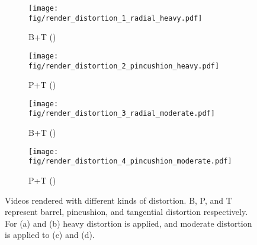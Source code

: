     \begin{figure}[t]
    	\begin{center}
    		\captionsetup{justification=centering}
    		\begin{subfigure}[t]{0.24\linewidth}
    			\centering
    			\texttt{[image: fig/render\_distortion\_1\_radial\_heavy.pdf]}
    			\caption{B+T ()}
    		\end{subfigure}
    		\begin{subfigure}[t]{0.24\linewidth}
    			\centering
    			\texttt{[image: fig/render\_distortion\_2\_pincushion\_heavy.pdf]}
    			\caption{P+T ()}
    		\end{subfigure}
    		\begin{subfigure}[t]{0.24\linewidth}
    			\centering
    			\texttt{[image: fig/render\_distortion\_3\_radial\_moderate.pdf]}
    			\caption{B+T ()}
    		\end{subfigure}
    		\begin{subfigure}[t]{0.24\linewidth}
    			\centering
    			\texttt{[image: fig/render\_distortion\_4\_pincushion\_moderate.pdf]}
    			\caption{P+T ()}
    		\end{subfigure}
    		\vspace{-1mm}
    	\end{center}
    	    \vspace{-5mm}
    		\caption{Videos rendered with different kinds of distortion. B, P, and T represent barrel, pincushion, and tangential distortion respectively. For (a) and (b) heavy distortion is applied, and moderate distortion is applied to (c) and (d).}
    		\vspace{-4mm}
    	\label{fig:dataset_distorted}
    \end{figure}

